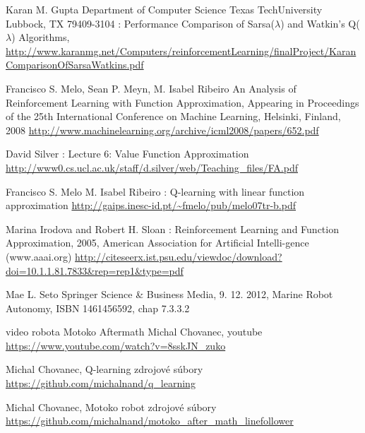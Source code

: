 \documentclass{acmbulletin}
\begin{document}
\begin{thebibliography}{99}
 Karan M. Gupta Department of Computer Science Texas TechUniversity Lubbock, TX 79409-3104 :
Performance Comparison of Sarsa($\lambda$) and Watkin’s Q($\lambda$) Algorithms,
\url{http://www.karanmg.net/Computers/reinforcementLearning/finalProject/KaranComparisonOfSarsaWatkins.pdf}


 Francisco S. Melo, Sean P. Meyn, M. Isabel Ribeiro
An Analysis of Reinforcement Learning with Function Approximation,
Appearing in Proceedings of the 25th International Conference on Machine Learning, Helsinki, Finland, 2008
\url{http://www.machinelearning.org/archive/icml2008/papers/652.pdf}

 David Silver : Lecture 6: Value Function Approximation
\url{http://www0.cs.ucl.ac.uk/staff/d.silver/web/Teaching_files/FA.pdf}

 Francisco S. Melo M. Isabel Ribeiro : Q-learning with linear function approximation
\url{http://gaips.inesc-id.pt/~fmelo/pub/melo07tr-b.pdf}

 Marina Irodova and Robert H. Sloan : Reinforcement Learning and Function Approximation,
2005,  American  Association  for  Artificial  Intelli-gence (www.aaai.org)
\url{http://citeseerx.ist.psu.edu/viewdoc/download?doi=10.1.1.81.7833&rep=rep1&type=pdf}


Mae L. Seto Springer Science \& Business Media, 9. 12. 2012,
Marine Robot Autonomy, ISBN	1461456592, chap 7.3.3.2



 video robota Motoko Aftermath
Michal Chovanec, youtube
\url{https://www.youtube.com/watch?v=8sskJN_zuko}

 Michal Chovanec, Q-learning zdrojové súbory \url{https://github.com/michalnand/q_learning}

 Michal Chovanec, Motoko robot zdrojové súbory \url{https://github.com/michalnand/motoko_after_math_linefollower}


\end{thebibliography}








\balancecolumns
\end{document}
